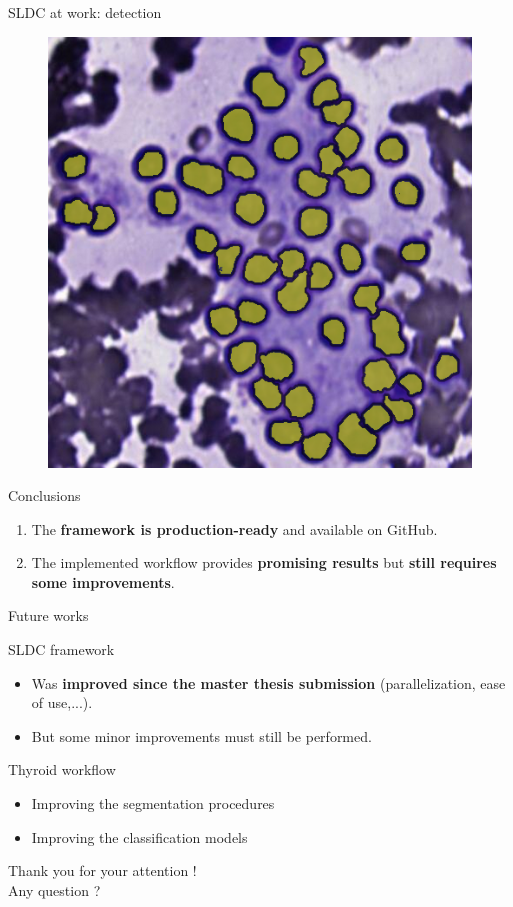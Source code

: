 \documentclass{beamer}
\begin{document}
\begin{frame}{SLDC at work: detection}
\begin{figure}
		\hspace{1cm}
		\includegraphics[scale=0.25]{images/success_reseg_2_nopat.png}
	\end{figure}
\end{frame}

\begin{frame}{Conclusions}
	\begin{enumerate}
		\item The \textbf{framework is production-ready} and available on GitHub.
		\vspace{1cm}
		\item The implemented workflow provides \textbf{promising results} but \textbf{still requires some improvements}.
	\end{enumerate}
\end{frame}

\begin{frame}{Future works}

	\begin{block}{SLDC framework}
		\begin{itemize}
			\item Was \textbf{improved since the master thesis submission} (parallelization, ease of use,...).
			\item But some minor improvements must still be performed.
		\end{itemize}
	\end{block}
	
		
	\begin{block}{Thyroid workflow}
		\begin{itemize}
			\item Improving the segmentation procedures
			\item Improving the classification models
		\end{itemize}
	\end{block}
\end{frame}

\begin{frame}
	\vfill
	\begin{center}
		Thank you for your attention ! \\
		Any question ?
	\end{center}
	\vfill
\end{frame}
\end{document}
